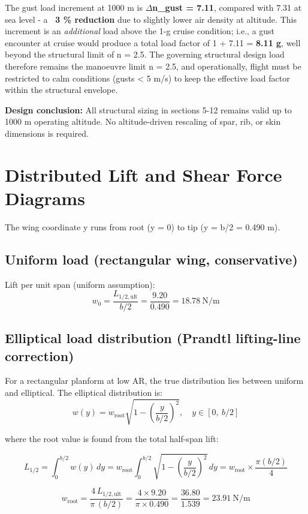 \documentclass[10pt,a4paper]{article}
\begin{document}
The gust load increment at 1000 m is \textbf{${\Delta}$n\_gust = 7.11}, compared with 7.31 at sea level - a \textbf{~3 \% reduction} due to slightly lower air density at altitude. This increment is an \textit{additional} load above the 1-g cruise condition; i.e., a gust encounter at cruise would produce a total load factor of 1 + 7.11 = \textbf{8.11 g}, well beyond the structural limit of n = 2.5. The governing structural design load therefore remains the manoeuvre limit n = 2.5, and operationally, flight must be restricted to calm conditions (gusts < 5 m/s) to keep the effective load factor within the structural envelope.

\textbf{Design conclusion:} All structural sizing in sections 5-12 remains valid up to 1000 m operating altitude. No altitude-driven rescaling of spar, rib, or skin dimensions is required.

\newpage \section{Distributed Lift and Shear Force Diagrams}

The wing coordinate y runs from root (y = 0) to tip (y = b/2 = 0.490 m).

\subsection{Uniform load (rectangular wing, conservative)}

Lift per unit span (uniform assumption):
\[
w_0 = \frac{L_{1/2,\text{ult}}}{b/2} = \frac{9.20}{0.490} = 18.78\ \text{N/m}
\]

\subsection{Elliptical load distribution (Prandtl lifting-line correction)}

For a rectangular planform at low AR, the true distribution lies between uniform and elliptical. The elliptical distribution is:
\[
w(y) = w_{\text{root}} \sqrt{1 - \left(\frac{y}{b/2}\right)^2}, \quad y \in [0,\ b/2]
\]

where the root value is found from the total half-span lift:

\[
L_{1/2} = \int_0^{b/2} w(y)\, dy = w_{\text{root}} \int_0^{b/2} \sqrt{1 - \left(\frac{y}{b/2}\right)^2}\, dy = w_{\text{root}} \times \frac{\pi (b/2)}{4}
\]

\[
w_{\text{root}} = \frac{4\, L_{1/2,\text{ult}}}{\pi\, (b/2)} = \frac{4 \times 9.20}{\pi \times 0.490} = \frac{36.80}{1.539} = 23.91\ \text{N/m}
\]
\end{document}
